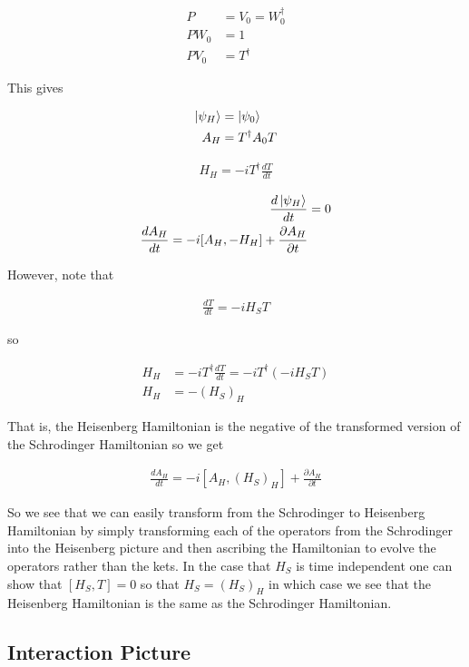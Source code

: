 \documentclass[12pt]{article}
\newcommand{\ddt}[1]{\frac{d #1}{dt}}
\newcommand{\ppt}[1]{\frac{\partial #1}{\partial t}}
\begin{document}
\begin{align}
P &= V_0 = W_0^{\dag}\\
PW_0 &= 1\\
PV_0 &= T^{\dag}
\end{align}

This gives

\begin{align}
\ket{\psi_H} &= \ket{\psi_0}\\
A_H &= T^{\dag}A_0T\\
\end{align}

\begin{align}
H_H = -iT^{\dag} \ddt{T}
\end{align}

\begin{align}
\ddt{\ket{\psi_H}} &= 0\\
\ddt{A_H} = -i[A_H,-H_H] + \ppt{A_H}
\end{align}

However, note that

\begin{align}
\ddt{T} = -iH_S T
\end{align}

so

\begin{align}
H_H &= -iT^{\dag} \ddt{T} = -i T^{\dag}(-iH_S T)\\
H_H &= -(H_S)_H
\end{align}

That is, the Heisenberg Hamiltonian is the negative of the transformed version of the Schrodinger Hamiltonian so we get

\begin{align}
\ddt{A_H} = -i[A_H,(H_S)_H] + \ppt{A_H}
\end{align}

So we see that we can easily transform from the Schrodinger to Heisenberg Hamiltonian by simply transforming each of the operators from the Schrodinger into the Heisenberg picture and then ascribing the Hamiltonian to evolve the operators rather than the kets. In the case that $H_S$ is time independent one can show that $[H_S,T] = 0$ so that $H_S = (H_S)_H$ in which case we see that the Heisenberg Hamiltonian is the same as the Schrodinger Hamiltonian.

\subsection{Interaction Picture}
\end{document}
